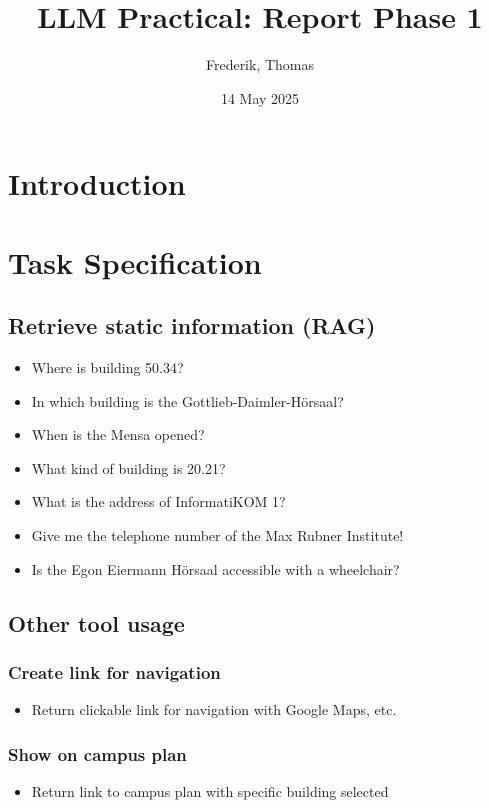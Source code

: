 \documentclass{article}
\title{LLM Practical: Report Phase 1}
\author{Frederik, Thomas}
\date{14 May 2025}
\begin{document}
\maketitle

\section{Introduction}

\section{Task Specification}


\subsection{Retrieve static information (RAG)}
  \begin{itemize}
      \item Where is building 50.34?
      \item In which building is the Gottlieb-Daimler-Hörsaal?
      \item When is the Mensa opened?
      \item What kind of building is 20.21?
      \item What is the address of InformatiKOM 1?
      \item Give me the telephone number of the Max Rubner Institute!
      \item Is the Egon Eiermann Hörsaal accessible with a wheelchair?
  \end{itemize}


\subsection{Other tool usage}

\subsubsection{Create link for navigation}
  \begin{itemize}
  \item Return clickable link for navigation with Google Maps, etc.
  \end{itemize}

\subsubsection{Show on campus plan}
  \begin{itemize}
  \item Return link to campus plan with specific building selected
  \end{itemize}
\end{document}
